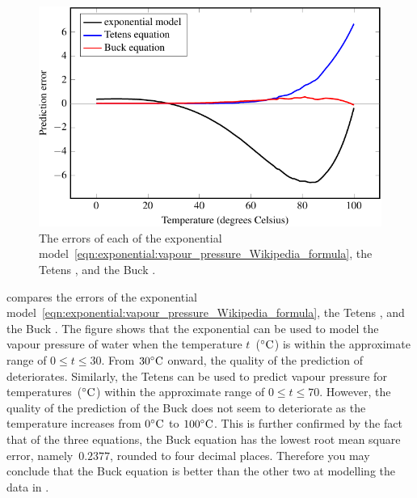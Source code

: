 \documentclass[a4paper,oneside,12pt]{article}
\begin{document}
\begin{problem}
{\begin{solution}
\begin{figure}[!htbp]
\centering
\includegraphics[scale=1.1]{image/11/vapour-pressure-errors.pdf}
\caption{%
  The errors of each of the exponential
  model~\eqref{eqn:exponential:vapour_pressure_Wikipedia_formula}, the
  Tetens , and the
  Buck .
}
\label{fig:exponential:vapour_pressure_errors}
\end{figure}

 compares the errors of
the exponential
model~\eqref{eqn:exponential:vapour_pressure_Wikipedia_formula}, the
Tetens , and the Buck
.  The figure shows
that the exponential
 can be
used to model the vapour pressure of water when the temperature
$t$~(${}^{\circ}\textrm{C}$) is within the approximate range of
$0 \leq t \leq 30$.  From ${30}^{\circ}\textrm{C}$ onward, the quality of the
prediction of
deteriorates.  Similarly, the Tetens
 can be used to
predict vapour pressure for temperatures~(${}^{\circ}\textrm{C}$) within the
approximate range of $0 \leq t \leq 70$.  However, the quality of the
prediction of the Buck 
does not seem to deteriorate as the temperature increases from
${0}^{\circ}\textrm{C}$ to ${100}^{\circ}\textrm{C}$.  This is further confirmed by the
fact that of the three equations, the Buck equation has the lowest
root mean square error, namely~$0.2377$, rounded to four decimal
places.  Therefore you may conclude that the Buck equation is better
than the other two at modelling the data in
.
\end{solution}
}{}


\end{problem}
\end{document}
